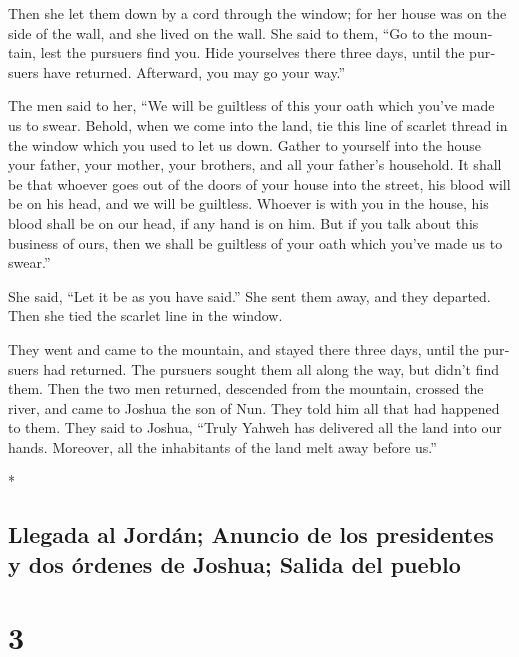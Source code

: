 \begin{paracol}{2}
\begin{otherlanguage}{english}
 Then she let them down by a cord through the window; for
her house was on the side of the wall, and she lived on the wall.
 She said to them, ``Go to the mountain, lest the
pursuers find you. Hide yourselves there three days, until the pursuers
have returned. Afterward, you may go your way.''

 The men said to her, ``We will be guiltless of this your
oath which you've made us to swear.  Behold, when we come
into the land, tie this line of scarlet thread in the window which you
used to let us down. Gather to yourself into the house your father, your
mother, your brothers, and all your father's household. 
It shall be that whoever goes out of the doors of your house into the
street, his blood will be on his head, and we will be guiltless. Whoever
is with you in the house, his blood shall be on our head, if any hand is
on him.  But if you talk about this business of ours,
then we shall be guiltless of your oath which you've made us to swear.''

 She said, ``Let it be as you have said.'' She sent them
away, and they departed. Then she tied the scarlet line in the window.

 They went and came to the mountain, and stayed there
three days, until the pursuers had returned. The pursuers sought them
all along the way, but didn't find them.  Then the two
men returned, descended from the mountain, crossed the river, and came
to Joshua the son of Nun. They told him all that had happened to them.
 They said to Joshua, ``Truly Yahweh has delivered all
the land into our hands. Moreover, all the inhabitants of the land melt
away before us.''

\end{otherlanguage}

\switchcolumn[0]*

\hypertarget{llegada-al-jorduxe1n-anuncio-de-los-presidentes-y-dos-uxf3rdenes-de-joshua-salida-del-pueblo}{%
\subsection{Llegada al Jordán; Anuncio de los presidentes y dos órdenes
de Joshua; Salida del
pueblo}\label{llegada-al-jorduxe1n-anuncio-de-los-presidentes-y-dos-uxf3rdenes-de-joshua-salida-del-pueblo}}

\hypertarget{section-4}{%
\section{3}\label{section-4}}


\end{paracol}
